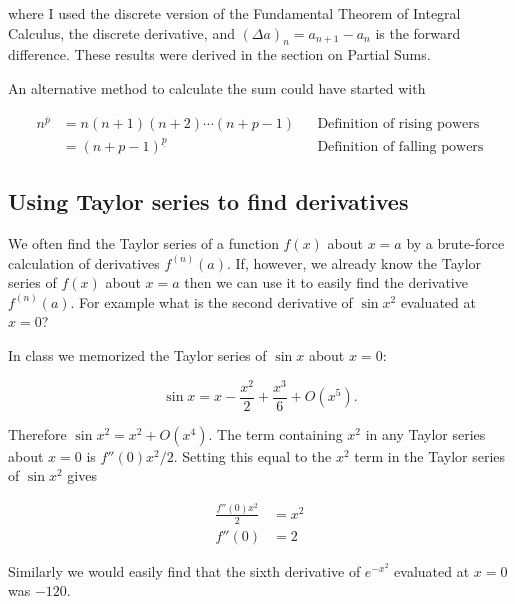 \documentclass{article}
\begin{document}
\noindent where I used the discrete version of the Fundamental Theorem of
Integral Calculus, the discrete derivative, and $(\Delta a)_n=a_{n+1}-a_n$ is
the forward difference. These results were derived in the section on Partial
Sums.

An alternative method to calculate the sum could have started with

\begin{align*}
    n^{\overline{p}}&=n(n+1)(n+2)\cdots(n+p-1) && \text{Definition of rising powers}\\
    &=(n+p-1)^{\underline{p}}  && \text{Definition of falling powers}
\end{align*}



\subsection*{Using Taylor series to find derivatives}

We often find the Taylor series of a function $f(x)$ about $x=a$ by a
brute-force calculation of derivatives $f^{(n)}(a)$. If, however, we already
know the Taylor series of $f(x)$ about $x=a$ then we can use it to easily find
the derivative $f^{(n)}(a)$. For example what is the second derivative of $\sin
x^2$ evaluated at $x=0$?

In class we memorized the Taylor series of $\sin x$ about $x=0$:

$$
\sin x = x - \frac{x^2}{2} + \frac{x^3}{6} + O(x^5).
$$

\noindent Therefore $\sin x^2 = x^2 + O(x^4)$. The term containing $x^2$ in any
Taylor series about $x=0$ is $f''(0)x^2/2$. Setting this equal to the $x^2$
term in the Taylor series of $\sin x^2$ gives

\begin{align*}
    \frac{f''(0)x^2}{2} &= x^2 \\
    f''(0) &=  2
\end{align*}

\noindent Similarly we would easily find that the sixth derivative of
$e^{-x^2}$ evaluated at $x=0$ was $-120$.
\end{document}
